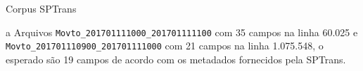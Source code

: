 \documentclass{beamer}
\begin{document}
\begin{frame}{Corpus SPTrans}
\begin{table}[!htb]
\begin{adjustbox}{max height=10mm, width=4in}
\begin{threeparttable}
\begin{tablenotes}
\item[a] Arquivos  \texttt{Movto\_201701111000\_201701111100} com 35 campos na linha 60.025 e \texttt{Movto\_201701110900\_201701111000} com 21 campos na linha 1.075.548, o esperado são 19 campos de acordo com os metadados fornecidos pela SPTrans.
\end{tablenotes}
\end{threeparttable}
\end{adjustbox}
\end{table}
\end{frame}
\end{document}
